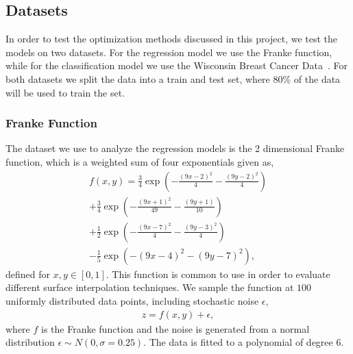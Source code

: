\documentclass[english,notitlepage,reprint,nofootinbib]{revtex4-2}  %
\begin{document}
\subsection*{Datasets} %
In order to test the optimization methods discussed in this project, we test the models on two datasets. For the regression model we use the Franke function, while for the classification model we use the Wisconsin Breast Cancer Data~\cite{BreastCancerData}. 
For both datasets we split the data into a train and test set, where $80\%$ of the data will be used to train the set. 

\subsubsection*{Franke Function}
The dataset we use to analyze the regression models is the 2 dimensional Franke function, which is a weighted sum of four exponentials given as, 
\begin{align}\label{eq: frankie}
    f(x,y) = \frac{3}{4} \exp\left(
             -\frac{{\left( 9x-2\right)}^2}{4}
             -\frac{{\left( 9y-2\right)}^2}{4}
             \right) 
             \\ 
            +\frac{3}{4} \exp\left(
             -\frac{{\left( 9x+1\right)}^2}{49}
             -\frac{{\left( 9y+1\right)}}{10}
             \right) \nonumber
             \\ 
            +\frac{1}{2} \exp\left(
             -\frac{{\left( 9x-7\right)}^2}{4}
             -\frac{{\left( 9y-3\right)}^2}{4}
             \right) \nonumber
             \\ 
            -\frac{1}{5} \exp\left(
            -{\left(9x-4\right)}^2 - {\left(9y-7\right)}^2
             \right), \nonumber
\end{align}
defined for $x,y\in [0,1]$. 
This function is common to use in order to evaluate different surface interpolation techniques. 
We sample the function at $100$ uniformly distributed data points, including stochastic noise $\epsilon$, 
\begin{align*}
    z = f(x,y) + \epsilon, 
\end{align*}
where $f$ is the Franke function and the noise is generated from a normal distribution $\epsilon\sim N(0,\sigma=0.25)$. 
The data is fitted to a polynomial of degree $6$. 
\end{document}
